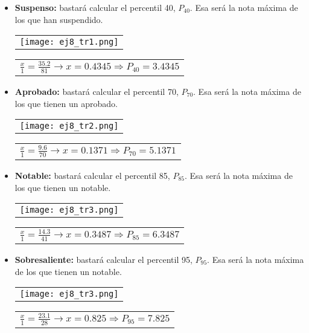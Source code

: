 \documentclass[11pt,a4paper]{article}
\theoremstyle{definition}
\begin{document}
\begin{itemize}
	\item \textbf{Suspenso:} bastará calcular el percentil 40, $P_{40}$. Esa será la nota máxima de los que han suspendido.
	\begin{table}[!htbp]
\hspace*{1.1 cm}
\begin{tabular}{c}
\texttt{[image: ej8\_tr1.png]} \\
\end{tabular}
{
\begin{tabular}{l}
$ \frac{x}{1}=\frac{35.2}{81} \rightarrow x = 0.4345 \Rightarrow P_{40}= 3.4345 $
\end{tabular}}

\end{table}	

\item \textbf{Aprobado:} bastará calcular el percentil 70, $P_{70}$. Esa será la nota máxima de los que tienen un aprobado.
	\begin{table}[!htbp]
\hspace*{1.1 cm}
\begin{tabular}{c}
\texttt{[image: ej8\_tr2.png]} \\
\end{tabular}
{
\begin{tabular}{l}
$ \frac{x}{1}=\frac{9.6}{70} \rightarrow x = 0.1371 \Rightarrow P_{70}= 5.1371 $
\end{tabular}}

\end{table}

\pagebreak

\item \textbf{Notable:} bastará calcular el percentil 85, $P_{85}$. Esa será la nota máxima de los que tienen un notable.
	\begin{table}[!htbp]
\hspace*{1.1 cm}
\begin{tabular}{c}
\texttt{[image: ej8\_tr3.png]} \\
\end{tabular}
{
\begin{tabular}{l}
$ \frac{x}{1}=\frac{14.3}{41} \rightarrow x = 0.3487 \Rightarrow P_{85}= 6.3487 $
\end{tabular}}

\end{table}

\item \textbf{Sobresaliente:} bastará calcular el percentil 95, $P_{95}$. Esa será la nota máxima de los que tienen un notable.
	\begin{table}[!htbp]
\hspace*{1.1 cm}
\begin{tabular}{c}
\texttt{[image: ej8\_tr3.png]} \\
\end{tabular}
{
\begin{tabular}{l}
$ \frac{x}{1}=\frac{23.1}{28} \rightarrow x = 0.825 \Rightarrow P_{95}= 7.825 $
\end{tabular}}


\end{table}
\end{itemize}
\end{document}
